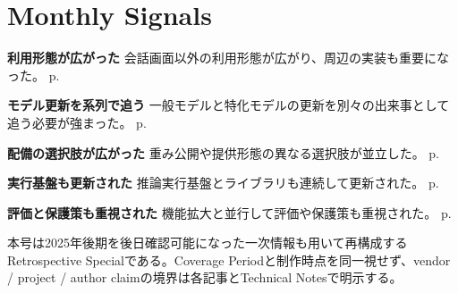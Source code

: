 \section*{Monthly Signals}
\smallskip
\noindent\textbf{利用形態が広がった} 会話画面以外の利用形態が広がり、周辺の実装も重要になった。 \hfill{\footnotesize p.~\pageref{pkg:agent}}\par
\smallskip
\noindent\textbf{モデル更新を系列で追う} 一般モデルと特化モデルの更新を別々の出来事として追う必要が強まった。 \hfill{\footnotesize p.~\pageref{pkg:model}}\par
\smallskip
\noindent\textbf{配備の選択肢が広がった} 重み公開や提供形態の異なる選択肢が並立した。 \hfill{\footnotesize p.~\pageref{pkg:open}}\par
\smallskip
\noindent\textbf{実行基盤も更新された} 推論実行基盤とライブラリも連続して更新された。 \hfill{\footnotesize p.~\pageref{pkg:runtime}}\par
\smallskip
\noindent\textbf{評価と保護策も重視された} 機能拡大と並行して評価や保護策も重視された。 \hfill{\footnotesize p.~\pageref{pkg:control}}\par
\medskip
\begin{claimboundary}
本号は2025年後期を後日確認可能になった一次情報も用いて再構成するRetrospective Specialである。Coverage Periodと制作時点を同一視せず、vendor / project / author claimの境界は各記事とTechnical Notesで明示する。
\end{claimboundary}
\medskip
\tableofcontents
